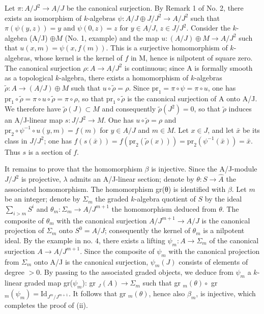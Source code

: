 Let \(\pi: A/J^{2} \to A/J\) be the canonical surjection. By Remark 1 of No. 2, there exists an isomorphism of \(k\)-algebras \(\psi: A/J \oplus J/J^{2} \longrightarrow A/J^{2}\) such that \(\pi(\psi(y,z)) = y\) and \(\psi(0,z) = z\) for \(y \in A/J\), \(z \in J/J^{2}\). Consider the \(k\)-algebra (A/J) \(\oplus M\) (No. 1, example) and the map \(u: (A/J) \oplus M \to A/J^{2}\) such that \(u(x,m) = \psi(x,f(m))\). This is a surjective homomorphism of \(k\)-algebras, whose kernel is the kernel of \(f\) in M, hence is nilpotent of square zero. The canonical surjection \(\rho: A \to A/J^{2}\) is continuous; since A is formally smooth as a topological \(k\)-algebra, there exists a homomorphism of \(k\)-algebras \(\tilde{\rho}: A \to (A/J) \oplus M\) such that \(u \circ \tilde{\rho} = \rho\). Since \(\mathrm{pr}_{1} = \pi \circ \psi = \pi \circ u\), one has \(\mathrm{pr}_{1} \circ \tilde{\rho} = \pi \circ u \circ \tilde{\rho} = \pi \circ \rho\), so that \(\mathrm{pr}_{1} \circ \tilde{\rho}\) is the canonical surjection of A onto A/J. We therefore have \(\tilde{\rho}(J) \subset M\) and consequently \(\tilde{\rho}(J^{2}) = 0\), so that \(\tilde{\rho}\) induces an A/J-linear map \(s: J/J^{2} \to M\). One has \(u \circ \tilde{\rho} = \rho\) and \(\mathrm{pr}_{2} \circ \psi^{-1} \circ u(y,m) = f(m)\) for \(y \in A/J\) and \(m \in M\). Let \(x \in J\), and let \(\bar{x}\) be its class in \(J/J^{2}\); one has \(f(s(\bar{x})) = f(\mathrm{pr}_{2}(\tilde{\rho}(x))) = \mathrm{pr}_{2}(\psi^{-1}(\bar{x})) = \bar{x}\). Thus \(s\) is a section of \(f\).

It remains to prove that the homomorphism \(\beta\) is injective. Since the A/J-module \(J/J^{2}\) is projective, \(\lambda\) admits an A/J-linear section; denote by \(\theta: S \to \widehat{A}\) the associated homomorphism. The homomorphism gr(θ) is identified with \(\beta\). Let \(m\) be an integer; denote by \(\Sigma_{m}\) the graded \(k\)-algebra quotient of \(S\) by the ideal \(\sum_{i > m} S^{i}\) and \(\theta_{m}: \Sigma_{m} \to A/J^{m+1}\) the homomorphism deduced from \(\theta\). The composite of \(\theta_{m}\) with the canonical surjection \(A/J^{m+1} \longrightarrow A/J\) is the canonical projection of \(\Sigma_{m}\) onto \(S^{0} = A/J\); consequently the kernel of \(\theta_{m}\) is a nilpotent ideal. By the example in no. 4, there exists a lifting \(\psi_{m}: A \to \Sigma_{m}\) of the canonical surjection \(A \to A/J^{m+1}\). Since the composite of \(\psi_{m}\) with the canonical projection from \(\Sigma_{m}\) onto A/J is the canonical surjection, \(\psi_{m}(J)\) consists of elements of degree \(>0\). By passing to the associated graded objects, we deduce from \(\psi_{m}\) a \(k\)-linear graded map gr(\(\psi_{m}\)): gr \(_{J}(A) \to \Sigma_{m}\) such that gr \(_{m}(\theta) \circ\) gr \(_{m}(\psi_{m}) = \text{Id}_{J^{m}/J^{m+1}}\). It follows that gr \(_{m}(\theta)\), hence also \(\beta_{m}\), is injective, which completes the proof of (ii).

